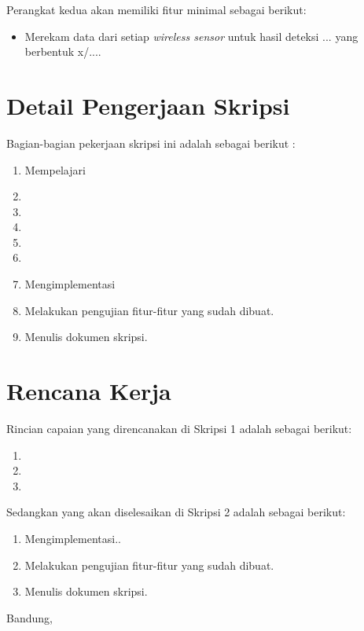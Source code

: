 \documentclass[a4paper,twoside]{article}
\begin{document}
Perangkat kedua akan memiliki fitur minimal sebagai berikut:
\begin{itemize}
	\item Merekam data dari setiap {\it wireless sensor} untuk hasil deteksi ... yang berbentuk x/....
\end{itemize}

\section{Detail Pengerjaan Skripsi}
Bagian-bagian pekerjaan skripsi ini adalah sebagai berikut :
	\begin{enumerate}
		\item Mempelajari 
		\item 
		\item 
		\item 
		\item 
		\item 
		\item Mengimplementasi 
		\item Melakukan pengujian fitur-fitur yang sudah dibuat.
		\item Menulis dokumen skripsi.
	\end{enumerate}

\section{Rencana Kerja}
Rincian capaian yang direncanakan di Skripsi 1 adalah sebagai berikut:
\begin{enumerate}
\item 
\item 
\item 
\end{enumerate}

Sedangkan yang akan diselesaikan di Skripsi 2 adalah sebagai berikut:
\begin{enumerate}
\item Mengimplementasi..
\item Melakukan pengujian fitur-fitur yang sudah dibuat.
\item Menulis dokumen skripsi.
\end{enumerate}

\vspace{1cm}
\centering Bandung, \tanggal\\
\vspace{2cm} \nama \\ 
\vspace{1cm}
\end{document}
